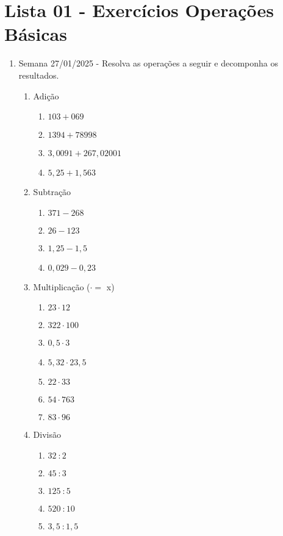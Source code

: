 \section{Lista 01 - Exercícios Operações Básicas}


\begin{enumerate}
	\item Semana 27/01/2025 - Resolva as operações a seguir e decomponha os resultados.
	
	\begin{enumerate}
		\item Adição
			\begin{enumerate}
				\item  $ 103 + 069 $
				\item  $ 1394+78998 $
				\item  $ 3,0091+267,02001$
				\item  $ 5,25 + 1,563 $
				
			\end{enumerate}
		\item Subtração
		
			\begin{enumerate}
				\item  $ 371 - 268 $
				\item  $ 26 - 123 $
				\item  $ 1,25 - 1,5$
				\item  $ 0,029 - 0,23 $
				
			\end{enumerate}
		\item Multiplicação ($ \cdot =$ x)
		
			\begin{enumerate}
				\item  $ 23 \cdot 12 $
				\item  $ 322 \cdot 100 $
				\item  $ 0,5 \cdot 3 $
				\item  $ 5,32 \cdot 23,5 $
				\item  $ 22 \cdot 33 $
				\item  $ 54 \cdot 763 $				
				\item  $ 83 \cdot 96 $
			\end{enumerate}
		
		\item Divisão
			\begin{enumerate}
				\item  $ 32 \ : 2 $
				\item  $ 45\ : 3 $
				\item  $ 125\ : 5 $
				\item  $ 520\ : 10 $
				\item  $ 3,5\ : 1,5 $
			\end{enumerate}
	

\end{enumerate}
\end{enumerate}
